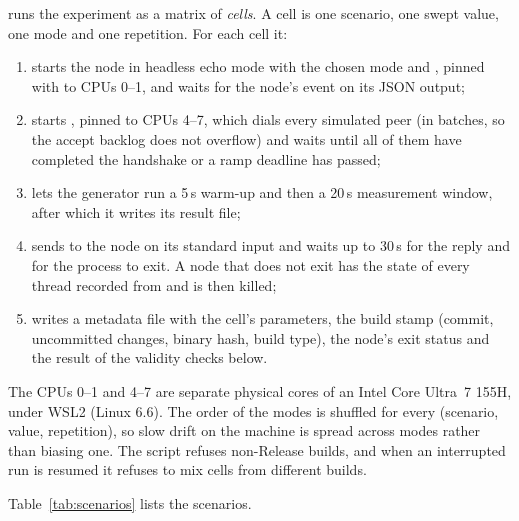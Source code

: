  runs the experiment as a matrix of \emph{cells}. A cell is one
scenario, one swept value, one mode and one repetition. For each cell it:
\begin{enumerate}
  \item starts the node in headless echo mode with the chosen  mode and
        , pinned with  to CPUs 0--1, and waits for the
        node's  event on its JSON output;
  \item starts , pinned to CPUs 4--7, which dials every simulated peer
        (in batches, so the accept backlog does not overflow) and waits until all of
        them have completed the handshake or a ramp deadline has passed;
  \item lets the generator run a 5\,s warm-up and then a 20\,s measurement window,
        after which it writes its result file;
  \item sends  to the node on its standard input and waits up to 30\,s for
        the reply  and for the process to exit. A node that does not exit
        has the state of every thread recorded from  and is then killed;
  \item writes a metadata file with the cell's parameters, the build stamp (commit,
        uncommitted changes, binary hash, build type), the node's exit status and the
        result of the validity checks below.
\end{enumerate}
The CPUs 0--1 and 4--7 are separate physical cores of an Intel Core Ultra~7 155H,
under WSL2 (Linux 6.6). The order of the modes is shuffled for every (scenario, value,
repetition), so slow drift on the machine is spread across modes rather than biasing
one. The script refuses non-Release builds, and when an interrupted run is resumed it
refuses to mix cells from different builds.

Table~\ref{tab:scenarios} lists the scenarios.

